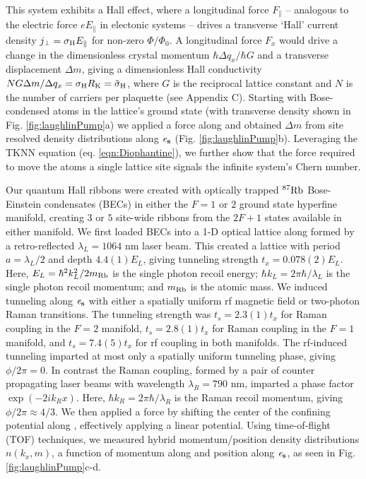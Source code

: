 	This system exhibits a Hall effect, where a longitudinal force $F_{\parallel}$ -- analogous to the electric force $e E_{\parallel}$ in electonic systems -- drives a transverse `Hall' current density $j_{\perp} = \sigma_{\rm{H}} E_{\parallel}$ for non-zero $\Phi/\Phi_0$. A longitudinal force $F_x$ would drive a change in the dimensionless crystal momentum $\hbar\Delta q_x/\hbar G$  and a transverse displacement $\Delta m$, giving a dimensionless Hall conductivity  $N G\Delta m/ \Delta q_x=\sigma_{\rm{H}} R_{\rm{K}}={\tilde\sigma}_{\rm{H}}$, where $G$ is the reciprocal lattice constant and $N$ is the number of carriers per plaquette (see Appendix C).  Starting with Bose-condensed atoms in the lattice's ground state (with transverse density shown in Fig. \ref{fig:laughlinPump}a) we applied a force along \ex and obtained $\Delta m$ from site resolved density distributions\cite{Wang2013} along $\bf{\mathit{e}_s}$ (Fig. \ref{fig:laughlinPump}b). Leveraging the TKNN equation (eq. \ref{eqn:Diophantine}), we further show that the force required to move the atoms a single lattice site signals the infinite system's Chern number. 
	
	Our quantum Hall ribbons were created with optically trapped $^{87}\rm{Rb}$ Bose-Einstein condensates (BECs) in either the $F=1$ or $2$ ground state hyperfine manifold, creating $3$ or $5$  site-wide ribbons from the $2F+1$ states available in either manifold. We first loaded BECs into a 1-D optical lattice along \ex formed by a retro-reflected $\lambda_L=1064$ nm laser beam. This created a lattice with period $a=\lambda_L/2$ and depth $4.4(1) E_L$, giving tunneling strength $t_x = 0.078(2) E_L$. Here, $E_L=\hbar^2 k_L^2/2m_{\rm{Rb}}$ is the single photon recoil energy; $\hbar k_L=2\pi\hbar/\lambda_L$ is the single photon recoil momentum; and $m_{\rm{Rb}}$ is the atomic mass. We induced tunneling along $\bf{\mathit{e}_s}$ with either a spatially uniform rf magnetic field or two-photon Raman transitions. The tunneling strength was $t_s = 2.3(1) t_x$ for Raman coupling in the $F=2$ manifold, $t_s = 2.8(1) t_x$ for Raman coupling in the $F=1$ manifold, and $t_s = 7.4(5) t_x$ for rf coupling in both manifolds. The rf-induced tunneling imparted at most only a spatially uniform tunneling phase, giving $\phi/2\pi = 0$. In contrast the Raman coupling, formed by a pair of counter propagating laser beams with wavelength $\lambda_R=790$ nm, imparted a phase factor $\exp{(-2ik_Rx)}$. Here, $\hbar k_R=2\pi\hbar/\lambda_R$ is the Raman recoil momentum, giving $\phi/2\pi\approx4/3$. We then applied a force by shifting the center of the confining potential along \ex, effectively applying a linear potential. Using time-of-flight (TOF) techniques\cite{Stuhl2015}, we measured hybrid momentum/position density distributions $n(k_x,m)$, a function of momentum along \ex and position along $\bf{\mathit{e}_s}$, as seen in Fig. \ref{fig:laughlinPump}c-d. 
	
